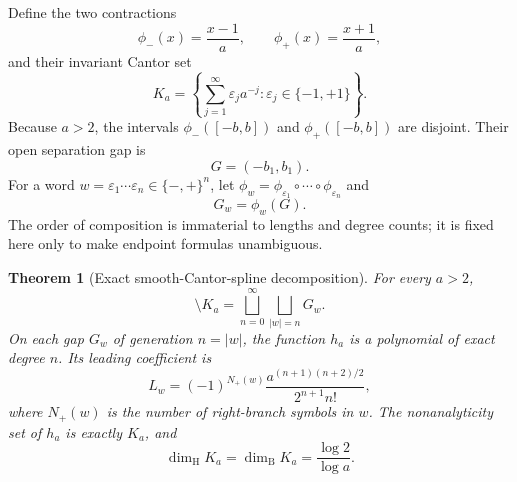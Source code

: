 \documentclass[11pt]{article}
\newtheorem{theorem}{Theorem}[section]
\theoremstyle{definition}
\theoremstyle{remark}
\begin{document}
Define the two contractions
\begin{equation}
  \phi_-(x)=\frac{x-1}{a},
  \qquad
  \phi_+(x)=\frac{x+1}{a},
  \label{eq:ifs-maps}
\end{equation}
and their invariant Cantor set
\begin{equation}
  K_a=\left\{\sum_{j=1}^{\infty}\varepsilon_j a^{-j}:
     \varepsilon_j\in\{-1,+1\}\right\}.
  \label{eq:Ka}
\end{equation}
Because \(a>2\), the intervals \(\phi_-([-b,b])\) and \(\phi_+([-b,b])\) are disjoint.  Their open separation gap is
\begin{equation}
  G=(-b_1,b_1).
  \label{eq:central-gap-G}
\end{equation}
For a word \(w=\varepsilon_1\cdots\varepsilon_n\in\{-,+\}^n\), let
\(\phi_w=\phi_{\varepsilon_1}\circ\cdots\circ\phi_{\varepsilon_n}\) and
\begin{equation}
  G_w=\phi_w(G).
  \label{eq:gap-word}
\end{equation}
The order of composition is immaterial to lengths and degree counts; it is fixed here only to make endpoint formulas unambiguous.

\begin{theorem}[Exact smooth-Cantor-spline decomposition]
\label{thm:exact-cantor-spline}
For every \(a>2\),
\begin{equation}
  [-b,b]\setminus K_a=\bigsqcup_{n=0}^{\infty}
     \bigsqcup_{|w|=n}G_w.
  \label{eq:gap-decomposition}
\end{equation}
On each gap \(G_w\) of generation \(n=|w|\), the function \(h_a\) is a polynomial of exact degree \(n\).  Its leading coefficient is
\begin{equation}
  L_w=(-1)^{N_+(w)}
  \frac{a^{(n+1)(n+2)/2}}{2^{n+1}n!},
  \label{eq:gap-leading-coefficient}
\end{equation}
where \(N_+(w)\) is the number of right-branch symbols in \(w\).  The nonanalyticity set of \(h_a\) is exactly \(K_a\), and
\begin{equation}
  \dim_{\mathrm H}K_a=\dim_{\mathrm B}K_a=\frac{\log2}{\log a}.
  \label{eq:Ka-dimension}
\end{equation}
\end{theorem}
\end{document}
